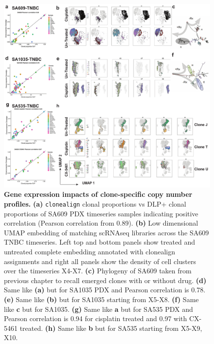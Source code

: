 \begin{figure}
\centering
\includegraphics[width=\textwidth]{Figures/fig2_clonealignembeddings.pdf}
	
\caption[Gene expression impacts of clone-specific copy number profiles]
	{\small
	\textbf{Gene expression impacts of clone-specific copy number profiles.}
	   \textbf{(a)} \texttt{clonealign} clonal proportions vs DLP+ clonal proportions of SA609 PDX timeseries samples indicating positive correlation (Pearson correlation from 0.89).
	    \textbf{(b)} Low dimensional \ac{UMAP} embedding of matching scRNAseq libraries across the SA609 TNBC timeseries. Left top and bottom panels show treated and untreated complete embedding annotated with clonealign assignments and right all panels show the density of cell clusters over the timeseries X4-X7.
	     \textbf{(c)} Phylogeny of SA609 taken from previous chapter to recall emerged clones with or without drug. 
	     \textbf{(d)} Same like \textbf{(a)} but for SA1035 PDX and Pearson correlation is 0.78. \textbf{(e)} Same like \textbf{(b)} but for SA1035 starting from X5-X8. \textbf{(f)} Same like \textbf{c} but for SA1035. \textbf{(g)} Same like \textbf{a} but for SA535 PDX and Pearson correlation is 0.94 for cisplatin treated and 0.97 with CX-5461 treated. \textbf{(h)} Same like \textbf{b} but for SA535 starting from X5-X9, X10.
	}
	\label{fig:fig2_clonealignembeddings}
\end{figure}




